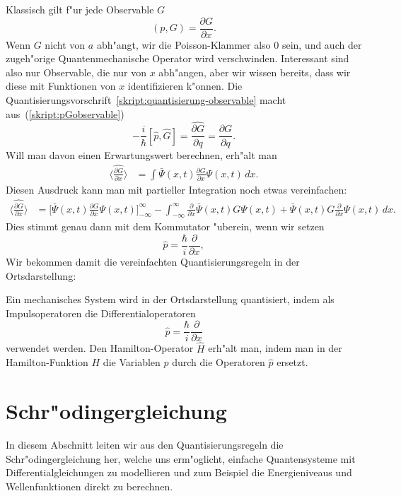 Klassisch gilt f"ur jede Observable $G$
\begin{equation}
(p,G)=\frac{\partial G}{\partial x}.
\label{skript:pGobservable}
\end{equation}
Wenn $G$ nicht von $a$ abh"angt, wir die Poisson-Klammer also $0$ sein,
und auch der zugeh"orige Quantenmechanische Operator wird verschwinden.
Interessant sind also nur Observable, die nur von $x$ abh"angen,
aber wir wissen bereits, dass wir diese mit Funktionen von $x$
identifizieren k"onnen.
Die Quantisierungsvorschrift~\ref{skript:quantisierung-observable}
macht aus~(\ref{skript:pGobservable})
\[
-\frac{i}{\hbar}[\hat p,\hat G]
=
\widehat{\frac{\partial G}{\partial q}}
=
\frac{\partial G}{\partial q}.
\]
Will man davon einen Erwartungswert berechnen, erh"alt man
\begin{align*}
\biggl\langle
\widehat{\frac{\partial G}{\partial x}}
\biggr\rangle
&=\int \bar\Psi(x,t)\frac{\partial G}{\partial x}\Psi(x,t)\,dx.
\end{align*}
Diesen Ausdruck kann man mit partieller Integration noch etwas
vereinfachen:
\begin{align*}
\biggl\langle
\widehat{\frac{\partial G}{\partial x}}
\biggr\rangle
&=
\biggl[
\bar\Psi(x,t)\frac{\partial G}{\partial x}\Psi(x,t)
\biggr]_{-\infty}^\infty
-
\int_{-\infty}^{\infty}
\frac{\partial}{\partial x}
\bar\Psi(x,t) G
\Psi(x,t)
+
\bar\Psi(x,t) G
\frac{\partial}{\partial x}
\Psi(x,t)
\,dx.
\end{align*}
Dies stimmt genau dann mit dem Kommutator "uberein, wenn wir setzen
\[
\hat p = \frac{\hbar}{i}\frac{\partial}{\partial x},
\]
Wir bekommen damit die vereinfachten Quantisierungsregeln in der
Ortsdarstellung:
\begin{satz}
\label{skript:quantisierungsregeln-ortsdarstellung}
Ein mechanisches System wird in der Ortsdarstellung quantisiert,
indem als Impulsoperatoren die Differentialoperatoren
\[
\hat p=\frac{\hbar}{i}\frac{\partial}{\partial x}
\]
verwendet werden. Den Hamilton-Operator $\hat H$ erh"alt man, indem man
in der Hamilton-Funktion $H$ die Variablen $p$ durch die Operatoren 
$\hat p$ ersetzt.
\end{satz}

\section{Schr"odingergleichung}
In diesem Abschnitt leiten wir aus den Quantisierungsregeln die
Schr"odingergleichung her, welche uns erm"oglicht, einfache
Quantensysteme mit Differentialgleichungen zu modellieren
und zum Beispiel die Energieniveaus und Wellenfunktionen direkt
zu berechnen.


